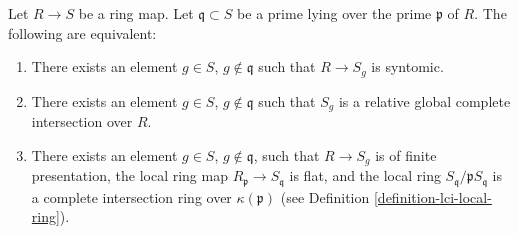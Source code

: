 \begin{lemma}
\label{lemma-syntomic}
Let $R \to S$ be a ring map.
Let $\mathfrak q \subset S$ be a prime lying over
the prime $\mathfrak p$ of $R$.
The following are equivalent:
\begin{enumerate}
\item There exists an element $g \in S$, $g \not \in \mathfrak q$ such that
$R \to S_g$ is syntomic.
\item There exists an element $g \in S$, $g \not \in \mathfrak q$
such that $S_g$ is a relative global complete intersection over $R$.
\item There exists an element $g \in S$, $g \not \in \mathfrak q$,
such that $R \to S_g$ is of finite presentation,
the local ring map $R_{\mathfrak p} \to S_{\mathfrak q}$ is flat, and
the local ring $S_{\mathfrak q}/\mathfrak pS_{\mathfrak q}$ is
a complete intersection ring over $\kappa(\mathfrak p)$ (see
Definition \ref{definition-lci-local-ring}).
\end{enumerate}
\end{lemma}

